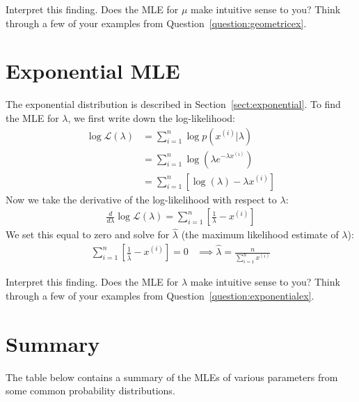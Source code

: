 \begin{question}{}
Interpret this finding. Does the MLE for $\mu$ make intuitive sense to you? Think through a few of your examples from Question~\ref{question:geometricex}. 
\end{question}

\section{Exponential MLE}

The exponential distribution is described in Section~\ref{sect:exponential}. To find the MLE for $\lambda$, we first write down the log-likelihood:
\begin{align*}
\log \mathcal{L}(\lambda) &= \sum_{i=1}^n \log p(x^{(i)}|\lambda) \\
&= \sum_{i=1}^n \log \left( \lambda e^{-\lambda x^{(i)}} \right) \\
&= \sum_{i=1}^n \left[\log(\lambda) - \lambda x^{(i)} \right] \end{align*}
Now we take the derivative of the log-likelihood with respect to $\lambda$:
\begin{align*}
\frac{d}{d \lambda} \log \mathcal{L}(\lambda) = \sum_{i=1}^n \left[ \frac{1}{\lambda} - x^{(i)} \right]
\end{align*}
We set this equal to zero and solve for $\hat{\lambda}$ (the maximum likelihood estimate of $\lambda$):
\begin{align*} \sum_{i=1}^n \left[ \frac{1}{\hat{\lambda}} - x^{(i)} \right] = 0 & \implies \boxed{\hat{\lambda} = \frac{n}{\sum_{i=1}^n x^{(i)}}} \end{align*}

\begin{question}{}
Interpret this finding. Does the MLE for $\lambda$ make intuitive sense to you? Think through a few of your examples from Question~\ref{question:exponentialex}. 
\end{question}

\section{Summary}

The table below contains a summary of the MLEs of various parameters from some common probability distributions.

